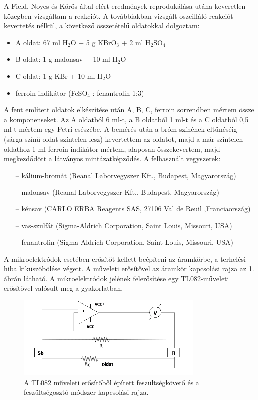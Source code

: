 A Field, Noyes és Kőrös által elért eredmények reprodukálása utána \cite{noyes1972oscillations} keveretlen közegben vizsgáltam a reakciót.
A továbbiakban vizsgált oszcilláló reakciót kevertetés nélkül, a következő összetételű oldatokkal dolgoztam: 

\begin{itemize} \label{komponensek}
\item A oldat: 67 ml H$_2$O + 5 g KBrO$_3$ + 2 ml H$_2$SO$_4$
\item B oldat: 1 g malonsav + 10 ml H$_2$O
\item C oldat: 1 g KBr + 10 ml H$_2$O
\item ferroin indikátor (FeSO$_4$ : fenantrolin 1:3)
\end{itemize}
A fent említett oldatok elkészítése után A, B, C, ferroin sorrendben mértem össze a komponenseket. Az A oldatból 6 ml-t, a B oldatból 1 ml-t és a C oldatból 0,5 ml-t mértem egy Petri-csészébe. A bemérés után a bróm színének eltűnéséig (sárga színű oldat színtelen lesz) kevertettem az oldatot, majd a már színtelen oldathoz 1 ml ferroin indikátor mértem, alaposan összekevertem, majd megkezdődött a látványos mintázatképződés. 
A felhasznált vegyszerek:
\begin{itemize}
\item[--]kálium-bromát (Reanal Laborvegyszer Kft., Budapest, Magyarország)
\item[--]malonsav (Reanal Laborvegyszer Kft., Budapest, Magyarország)
\item[--]kénsav (CARLO ERBA Reagents SAS, 27106 Val de Reuil ,Franciaország)
\item[--]vas-szulfát (Sigma-Aldrich Corporation, Saint Louis, Missouri, USA)
\item[--]fenantrolin (Sigma-Aldrich Corporation, Saint Louis, Missouri, USA)
\end{itemize}
A mikroelektródok esetében erősítőt kellett beépíteni az áramkörbe, a terhelési hiba kiküszöbölése végett. A műveleti erősítővel az áramkör kapcsolási rajza az \ref{fig:erosito}. ábrán látható. A mikroelektródok jelének felerősítése egy TL082-műveleti erősítővel valósult meg a gyakorlatban.
\begin{figure}[h!]
\centering
\includegraphics[width=0.8\textwidth]{img/erosito2.png}
\caption{A TL082 műveleti erősítőből épített feszültségkövető és a feszültségosztó módszer kapcsolási rajza.}
\label{fig:erosito}
\end{figure}
